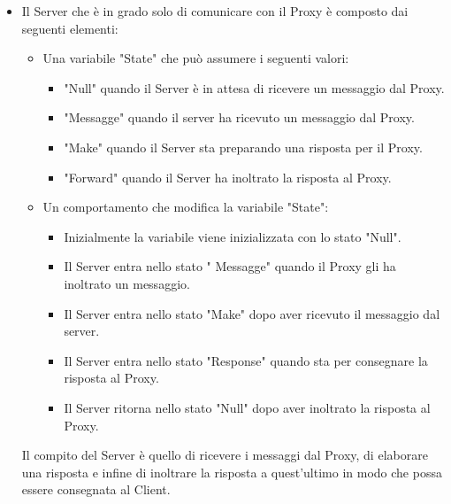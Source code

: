 \documentclass[13pt,a4paper]{article}
\begin{document}
\begin{itemize}
		\item Il Server che è in grado solo di comunicare con il Proxy è composto dai seguenti elementi:
		\begin{itemize}
			\item Una variabile "State" che può assumere i seguenti valori:
			\begin{itemize}
				\item "Null" quando il Server è in attesa di ricevere un messaggio dal Proxy.
				\item "Messagge" quando il server ha ricevuto un messaggio dal Proxy.
				\item "Make" quando il Server sta preparando una risposta per il Proxy.
				\item "Forward" quando il Server ha inoltrato la risposta al Proxy.
			\end{itemize}
		\item Un comportamento che modifica la variabile "State":
		\begin{itemize}
			\item Inizialmente la variabile viene inizializzata con lo stato "Null".
			\item Il Server entra nello stato " Messagge" quando il Proxy gli ha inoltrato un messaggio.
			\item Il Server entra nello stato "Make" dopo aver ricevuto il messaggio dal server.
			\item Il Server entra nello stato "Response" quando sta per consegnare la risposta al Proxy.
			\item Il Server ritorna nello stato "Null" dopo aver inoltrato la risposta al Proxy.
		\end{itemize}
		\end{itemize}
	 Il compito del Server è quello di ricevere i messaggi dal Proxy, di elaborare una risposta e infine di inoltrare la risposta a quest'ultimo in modo che possa essere consegnata al Client.
	\end{itemize}
\end{document}
